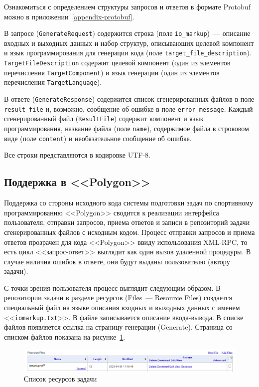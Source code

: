 \documentclass[times,specification,annotation]{style/itmo-student-thesis/itmo-student-thesis}
\begin{document}
Ознакомиться с определением структуры запросов и ответов в формате Protobuf можно в приложении~\ref{appendix-protobuf}.

В запросе (\texttt{GenerateRequest}) содержится строка (поле \texttt{io\_markup})~--- описание входных и выходных данных и набор структур, описывающих целевой компонент и язык программирования для генерации кода (поле \texttt{target\_file\_description}). \texttt{TargetFileDescription} содержит целевой компонент (один из элементов перечисления \texttt{TargetComponent}) и язык генерации (один из элементов перечисления \texttt{TargetLanguage}).

В ответе (\texttt{GenerateResponse}) содержится список сгенерированных файлов в поле \texttt{result\_file} и, возможно, сообщение об ошибке в поле \texttt{error\_message}. Каждый сгенерированный файл (\texttt{ResultFile}) содержит компонент и язык программирования, название файла (поле \texttt{name}), содержимое файла в строковом виде (поле \texttt{content}) и необязательное сообщение об ошибке.

Все строки представляются в кодировке UTF-8.

\subsection{Поддержка в <<Polygon>>}

Поддержка со стороны исходного кода системы подготовки задач по спортивному программированию <<Polygon>> сводится к реализации интерфейса пользователя, отправки запросов, приема ответов и записи в репозиторий задачи сгенерированных файлов с исходным кодом. Процесс отправки запросов и приема ответов прозрачен для кода <<Polygon>> ввиду использования XML-RPC, то есть цикл <<запрос-ответ>> выглядит как один вызов удаленной процедуры. В случае наличия ошибок в ответе, они будут выданы пользователю (автору задачи).

С точки зрения пользователя процесс выглядит следующим образом. В репозитории задачи в разделе ресурсов (Files~--- Resource Files) создается специальный файл на языке описания входных и выходных данных с именем <<\texttt{iomarkup.txt}>>. В файле записывается описание ввода-вывода. В списке файлов появляется ссылка на страницу генерации (Generate). Страница со списком файлов показана на рисунке~\ref{resources-screenshot}.

\begin{figure}[!h]
\caption{Список ресурсов задачи}\label{resources-screenshot}
\centering
\includegraphics[scale=0.6]{img/files.png}
\end{figure}
\end{document}
